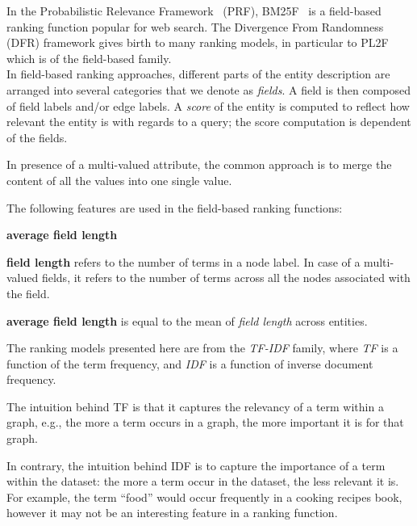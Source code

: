 In the Probabilistic Relevance Framework~\cite{Robertson:2009:PRF} (PRF), BM25F~\cite{zaragoza:2004:microsoft} is a field-based ranking function popular for web search.
The Divergence From Randomness~\cite{amati:2002:acm} (DFR) framework gives birth to many ranking models, in particular to PL2F~\cite{macdonald:2005:clef} which is of the field-based family.\\

In field-based ranking approaches, different parts of the entity description are arranged into several categories that we denote as \emph{fields}. A field is then composed of field labels and/or edge labels. A \emph{score} of the entity is computed to reflect how relevant the entity is with regards to a query; the score computation is dependent of the fields.

In presence of a multi-valued attribute, the common approach is to merge the content of all the values into one single value.


The following features are used in the field-based ranking functions:
\begin{labeling}{\textbf{average field length}}
	\item[\textbf{field length}] refers to the number of terms in a node label. In case of a multi-valued fields, it refers to the number of terms across all the nodes associated with the field.
	\item[\textbf{average field length}] is equal to the mean of \emph{field length} across entities.
\end{labeling}


The ranking models presented here are from the \emph{TF-IDF} family, where \emph{TF} is a function of the term frequency, and \emph{IDF} is a function of inverse document frequency.

The intuition behind TF is that it captures the relevancy of a term within a graph, e.g., the more a term occurs in a graph, the more important it is for that graph.

In contrary, the intuition behind IDF is to capture the importance of a term within the dataset: the more a term occur in the dataset, the less relevant it is. For example, the term ``food'' would occur frequently in a cooking recipes book, however it may not be an interesting feature in a ranking function.\\

